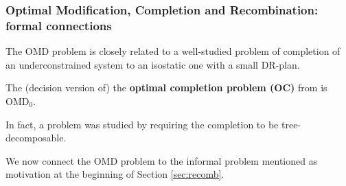 %
\subsubsection{Optimal Modification, Completion and Recombination: formal
connections}
%
The OMD problem is closely related to a well-studied problem of completion of an underconstrained system to an isostatic one with a small DR-plan.
\begin{observation}\label{obs:OC_to_OMD}
    The (decision version of) the \textbf{optimal completion problem (OC)} from \cite{sitharam2005combinatorial,joan-arinyo2003transforming,zhang-gao2006well} is OMD$_0$.
\end{observation}
In fact, a  problem was studied by \cite{joan-arinyo2003transforming} requiring the completion to be tree-decomposable.

We now connect the OMD problem to the informal  problem mentioned as motivation at the beginning of Section \ref{sec:recomb}.

